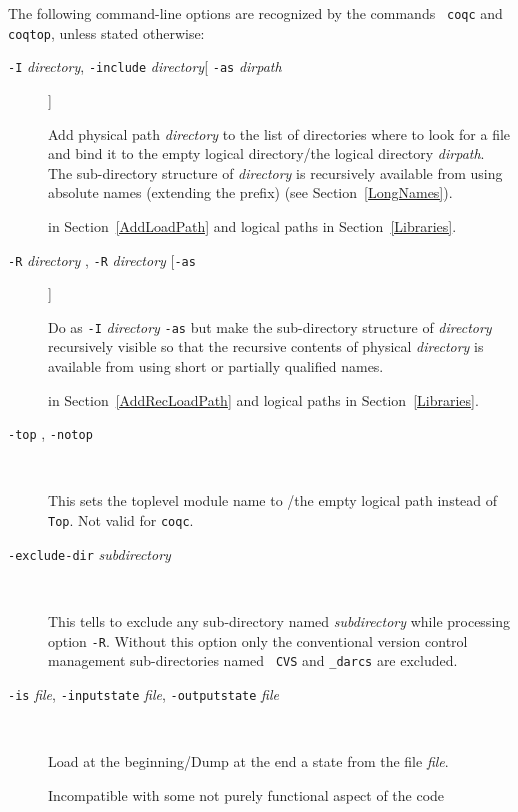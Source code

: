 The following command-line options are recognized by the commands {\tt
  coqc} and {\tt coqtop}, unless stated otherwise:

\begin{description}
\item[{\tt -I} {\em directory}, {\tt -include} {\em directory}[ {\tt -as} {\em dirpath}]]\ 

Add physical path {\em directory} to the list of directories where to look for a
file and bind it to the empty logical directory/the logical directory {\em
  dirpath}. The sub-directory structure of {\em directory} is recursively available
from {\Coq} using absolute names (extending the {\dirpath} prefix) (see
Section~\ref{LongNames}).

   in Section~\ref{AddLoadPath} and logical
  paths in Section~\ref{Libraries}.

\item[{\tt -R} {\em directory} {\dirpath}, {\tt -R} {\em directory} [{\tt -as} {\dirpath}]]\

  Do as {\tt -I} {\em directory} {\tt -as} {\dirpath} but make the
  sub-directory structure of {\em directory} recursively visible so
  that the recursive contents of physical {\em directory} is available
  from {\Coq} using short or partially qualified names.
  
   in Section~\ref{AddRecLoadPath} and logical
  paths in Section~\ref{Libraries}.

\item[{\tt -top} {\dirpath}, {\tt -notop}]\ 

  This sets the toplevel module name to {\dirpath}/the empty logical path instead
  of {\tt Top}. Not valid for {\tt coqc}.

\item[{\tt -exclude-dir} {\em subdirectory}]\ 

  This tells to exclude any sub-directory named {\em subdirectory}
  while processing option {\tt -R}. Without this option only the
  conventional version control management sub-directories named {\tt
  CVS} and {\tt \_darcs} are excluded.

\item[{\tt -is} {\em file}, {\tt -inputstate} {\em file}, {\tt -outputstate} {\em file}]\ 

  Load at the beginning/Dump at the end a \Coq{} state from the file {\em file}.

  Incompatible with some not purely functional aspect of the code 


\end{description}
